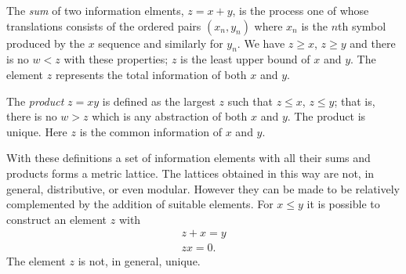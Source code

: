 \documentclass{article}[10pt, letter]
\begin{document}
The \textit{sum} of two information elments, $z = x + y$, is the process one of whose translations consists of the ordered pairs $(x_n, y_n)$ where $x_n$ is the $n$th symbol produced by the $x$ sequence and similarly for $y_n$. We have $z \geqslant x$, $z \geqslant y$ and there is no $w < z$ with these properties; $z$ is the least upper bound of $x$ and $y$. The element $z$ represents the total information of both $x$ and $y$.

The \textit{product} $z = x y$ is defined as the largest $z$ such that $z \leqslant x$, $z \leqslant y$; that is, there is no $w > z$ which is any abstraction of both $x$ and $y$. The product is unique. Here $z$ is the common information of $x$ and $y$.

With these definitions a set of information elements with all their sums and products forms a metric lattice. The lattices obtained in this way are not, in general, distributive, or even modular. However they can be made to be relatively complemented by the addition of suitable elements. For $x \leqslant y$ it is possible to construct an element $z$ with
\begin{align*}
	z + x = y \\
	z x = 0.
\end{align*}
The element $z$ is not, in general, unique.
\end{document}

